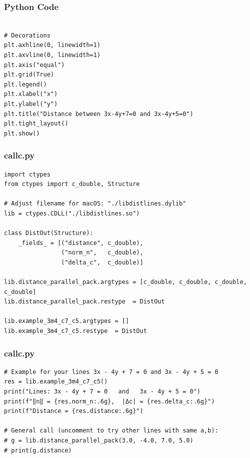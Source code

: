 \documentclass{beamer}
\begin{document}
 \begin{frame}[fragile]
    \frametitle{ Python Code}
    \begin{lstlisting}
   
# Decorations
plt.axhline(0, linewidth=1)
plt.axvline(0, linewidth=1)
plt.axis("equal")
plt.grid(True)
plt.legend()
plt.xlabel("x")
plt.ylabel("y")
plt.title("Distance between 3x-4y+7=0 and 3x-4y+5=0")
plt.tight_layout()
plt.show()

\end{lstlisting}
\end{frame}

\begin{frame}[fragile]
\frametitle{callc.py}
    \begin{lstlisting}    
import ctypes
from ctypes import c_double, Structure

# Adjust filename for macOS: "./libdistlines.dylib"
lib = ctypes.CDLL("./libdistlines.so")

class DistOut(Structure):
    _fields_ = [("distance", c_double),
                ("norm_n",   c_double),
                ("delta_c",  c_double)]

lib.distance_parallel_pack.argtypes = [c_double, c_double, c_double, c_double]
lib.distance_parallel_pack.restype  = DistOut

lib.example_3m4_c7_c5.argtypes = []
lib.example_3m4_c7_c5.restype  = DistOut

    \end{lstlisting}
\end{frame}
\begin{frame}[fragile]
\frametitle{callc.py}
\begin{lstlisting}
# Example for your lines 3x - 4y + 7 = 0 and 3x - 4y + 5 = 0
res = lib.example_3m4_c7_c5()
print("Lines: 3x - 4y + 7 = 0   and   3x - 4y + 5 = 0")
print(f"‖n‖ = {res.norm_n:.6g},  |Δc| = {res.delta_c:.6g}")
print(f"Distance = {res.distance:.6g}")

# General call (uncomment to try other lines with same a,b):
# g = lib.distance_parallel_pack(3.0, -4.0, 7.0, 5.0)
# print(g.distance)

\end{lstlisting} 
\end{frame}
\end{document}

